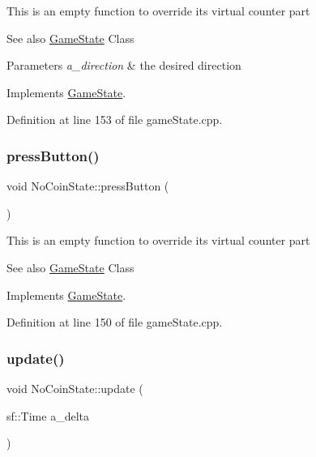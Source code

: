 This is an empty function to override it\textquotesingle{}s virtual counter part \begin{DoxySeeAlso}{See also}
\hyperlink{class_game_state}{Game\+State} Class 
\end{DoxySeeAlso}

\begin{DoxyParams}{Parameters}
{\em a\+\_\+direction} & the desired direction \\
\hline
\end{DoxyParams}


Implements \hyperlink{class_game_state_aaae8c1b3ae6969eb2dd81bfc12fbf43f}{Game\+State}.



Definition at line 153 of file game\+State.\+cpp.

\mbox{\label{class_no_coin_state_a47dd2924ce9601b45ee11e0d9b8452f7}} 
\subsubsection{\texorpdfstring{press\+Button()}{pressButton()}}
{\footnotesize\ttfamily void No\+Coin\+State\+::press\+Button (\begin{DoxyParamCaption}{ }\end{DoxyParamCaption})\hspace{0.3cm}{\ttfamily [virtual]}}

This is an empty function to override it\textquotesingle{}s virtual counter part \begin{DoxySeeAlso}{See also}
\hyperlink{class_game_state}{Game\+State} Class 
\end{DoxySeeAlso}


Implements \hyperlink{class_game_state_aa14eeaf244bcf19b7013af75cb722dde}{Game\+State}.



Definition at line 150 of file game\+State.\+cpp.

\mbox{\label{class_no_coin_state_af0194851310c6df176770713341a8b80}} 
\subsubsection{\texorpdfstring{update()}{update()}}
{\footnotesize\ttfamily void No\+Coin\+State\+::update (\begin{DoxyParamCaption}\item[{sf\+::\+Time}]{a\+\_\+delta }\end{DoxyParamCaption})\hspace{0.3cm}{\ttfamily [virtual]}}

